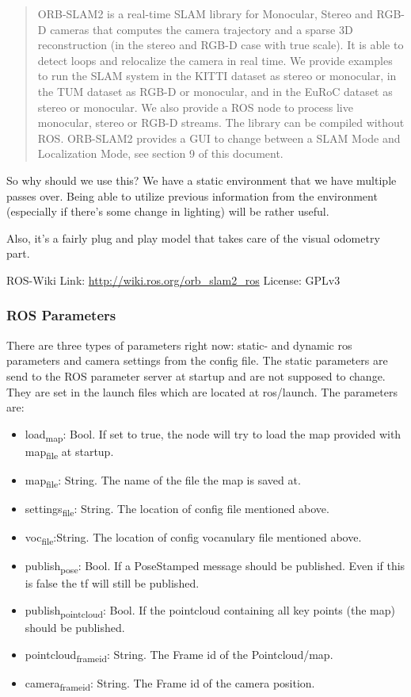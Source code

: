 \documentclass[unrestricted]{meetingnotesminutes}
\begin{document}
\begin{quote}
ORB-SLAM2 is a real-time SLAM library for Monocular, Stereo and RGB-D cameras that computes the camera trajectory and a sparse 3D reconstruction (in the stereo and RGB-D case with true scale). It is able to detect loops and relocalize the camera in real time. We provide examples to run the SLAM system in the KITTI dataset as stereo or monocular, in the TUM dataset as RGB-D or monocular, and in the EuRoC dataset as stereo or monocular. We also provide a ROS node to process live monocular, stereo or RGB-D streams. The library can be compiled without ROS. ORB-SLAM2 provides a GUI to change between a SLAM Mode and Localization Mode, see section 9 of this document.
\end{quote}


So why should we use this? We have a static environment that we have multiple passes over. Being able to utilize previous information from the environment (especially if there's some change in lighting) will be rather useful.

Also, it's a fairly plug and play model that takes care of the visual odometry part.



ROS-Wiki Link: \url{http://wiki.ros.org/orb\_slam2\_ros}
License: GPLv3

\subsubsection{ROS Parameters}
\label{sec:org399a42c}

There are three types of parameters right now: static- and dynamic ros parameters and camera settings from the config file. The static parameters are send to the ROS parameter server at startup and are not supposed to change. They are set in the launch files which are located at ros/launch. The parameters are:

\begin{itemize}
\item load\textsubscript{map}: Bool. If set to true, the node will try to load the map provided with map\textsubscript{file} at startup.
\item map\textsubscript{file}: String. The name of the file the map is saved at.
\item settings\textsubscript{file}: String. The location of config file mentioned above.
\item voc\textsubscript{file}:String. The location of config vocanulary file mentioned above.
\item publish\textsubscript{pose}: Bool. If a PoseStamped message should be published. Even if this is false the tf will still be published.
\item publish\textsubscript{pointcloud}: Bool. If the pointcloud containing all key points (the map) should be published.
\item pointcloud\textsubscript{frame}\textsubscript{id}: String. The Frame id of the Pointcloud/map.
\item camera\textsubscript{frame}\textsubscript{id}: String. The Frame id of the camera position.
\end{itemize}
\end{document}
